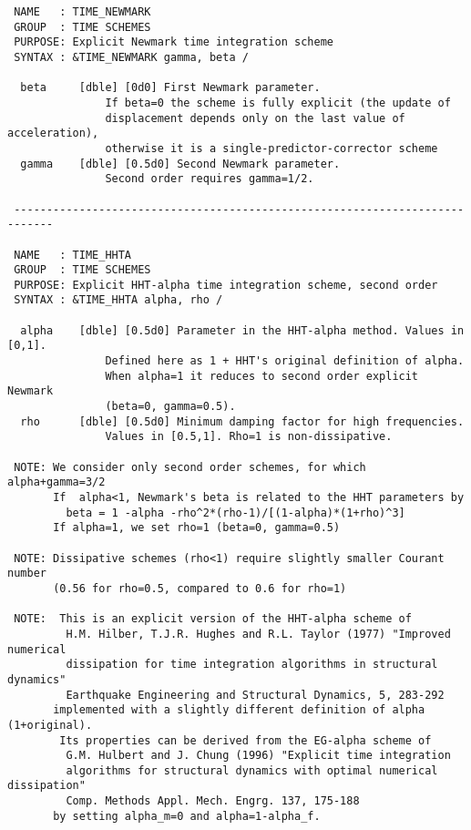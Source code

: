 \begin{verbatim}
 NAME   : TIME_NEWMARK
 GROUP  : TIME SCHEMES
 PURPOSE: Explicit Newmark time integration scheme 
 SYNTAX : &TIME_NEWMARK gamma, beta /

  beta     [dble] [0d0] First Newmark parameter.
               If beta=0 the scheme is fully explicit (the update of
               displacement depends only on the last value of acceleration),
               otherwise it is a single-predictor-corrector scheme
  gamma    [dble] [0.5d0] Second Newmark parameter.
               Second order requires gamma=1/2.

 ----------------------------------------------------------------------------

 NAME   : TIME_HHTA
 GROUP  : TIME SCHEMES
 PURPOSE: Explicit HHT-alpha time integration scheme, second order 
 SYNTAX : &TIME_HHTA alpha, rho /

  alpha    [dble] [0.5d0] Parameter in the HHT-alpha method. Values in [0,1].
               Defined here as 1 + HHT's original definition of alpha.
               When alpha=1 it reduces to second order explicit Newmark
               (beta=0, gamma=0.5).
  rho      [dble] [0.5d0] Minimum damping factor for high frequencies.
               Values in [0.5,1]. Rho=1 is non-dissipative.

 NOTE: We consider only second order schemes, for which alpha+gamma=3/2
       If  alpha<1, Newmark's beta is related to the HHT parameters by
         beta = 1 -alpha -rho^2*(rho-1)/[(1-alpha)*(1+rho)^3]
       If alpha=1, we set rho=1 (beta=0, gamma=0.5)
 
 NOTE: Dissipative schemes (rho<1) require slightly smaller Courant number
       (0.56 for rho=0.5, compared to 0.6 for rho=1)

 NOTE:	This is an explicit version of the HHT-alpha scheme of
         H.M. Hilber, T.J.R. Hughes and R.L. Taylor (1977) "Improved numerical 
         dissipation for time integration algorithms in structural dynamics" 
         Earthquake Engineering and Structural Dynamics, 5, 283-292
       implemented with a slightly different definition of alpha (1+original).
      	Its properties can be derived from the EG-alpha scheme of
         G.M. Hulbert and J. Chung (1996) "Explicit time integration 
         algorithms for structural dynamics with optimal numerical dissipation"
         Comp. Methods Appl. Mech. Engrg. 137, 175-188
       by setting alpha_m=0 and alpha=1-alpha_f.

\end{verbatim}
